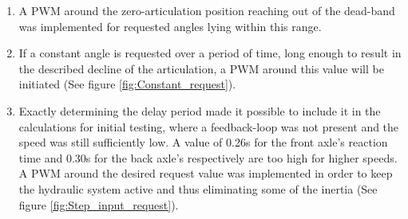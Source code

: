 \documentclass[root.tex]{subfiles}
\begin{document}
	\begin{enumerate}
		\item A \gls{PWM} around the zero-articulation position reaching out of the dead-band was implemented for requested angles lying within this range. 
		
		\item If a constant angle is requested over a period of time, long enough to result in the described decline of the articulation, a \gls{PWM} around this value will be initiated (See figure \ref{fig:Constant_request}). 
		
		\item Exactly determining the delay period made it possible to include it in the calculations for initial testing, where a feedback-loop was not present and the speed was still sufficiently low. A value of 0.26s for the front axle's reaction time and 0.30s for the back axle's respectively are too high for higher speeds.\\
		A \gls{PWM} around the desired request value was implemented in order to keep the hydraulic system active and thus eliminating some of the inertia (See figure \ref{fig:Step_input_request}). 
	\end{enumerate}
	
	
	
	
	
	
\end{document}
